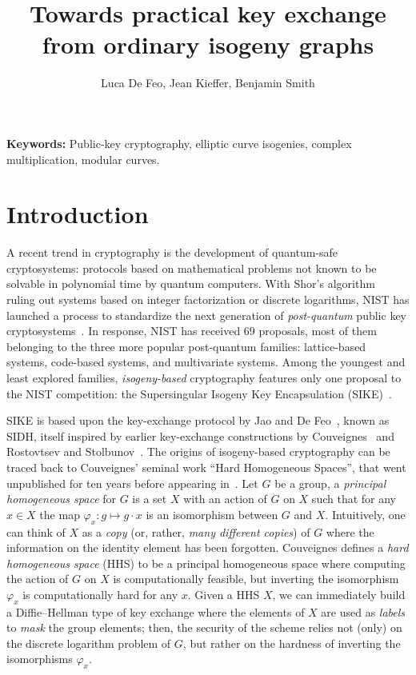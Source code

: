 \documentclass{article}
\title{Towards practical key exchange from ordinary isogeny graphs}
\author{Luca De Feo, Jean Kieffer, Benjamin Smith}
\theoremstyle{definition}
\begin{document}
\maketitle

\begin{abstract}
\end{abstract}

\textbf{Keywords:} Public-key cryptography, elliptic curve isogenies,
complex multiplication, modular curves.

\section{Introduction}
\label{sec:introduction}

A recent trend in cryptography is the development of quantum-safe
cryptosystems: protocols based on mathematical problems not known to
be solvable in polynomial time by quantum computers. With Shor's
algorithm~\cite{shor1994algorithms} ruling out systems based on
integer factorization or discrete logarithms, NIST has launched a
process to standardize the next generation of \emph{post-quantum}
public key cryptosystems~\cite{NIST2016}. In response, NIST has
received 69 proposals, most of them belonging to the three more
popular post-quantum families: lattice-based systems, code-based
systems, and multivariate systems. Among the youngest and least
explored families, \emph{isogeny-based} cryptography features only one
proposal to the NIST competition: the Supersingular Isogeny Key
Encapsulation (SIKE)~\cite{SIKE}.

SIKE is based upon the key-exchange protocol by Jao and De
Feo~\cite{jao+defeo2011}, known as SIDH, itself inspired by earlier
key-exchange constructions by Couveignes~\cite{cryptoeprint:2006:291}
and Rostovtsev and
Stolbunov~\cite{rostovtsev+stolbunov06,stolbunov-red,Stol}. The
origins of isogeny-based cryptography can be traced back to
Couveignes' seminal work ``Hard Homogeneous Spaces'', that went
unpublished for ten years before appearing
in~\cite{cryptoeprint:2006:291}. Let $G$ be a group, a \emph{principal
  homogeneous space} for $G$ is a set $X$ with an
action of $G$ on $X$ such that for any $x∈X$ the map $φ_x:g↦g·x$ is an
isomorphism between $G$ and $X$. Intuitively, one can think of $X$ as
a \emph{copy} (or, rather, \emph{many different copies}) of $G$ where
the information on the identity element has been forgotten. Couveignes
defines a \emph{hard homogeneous space} (HHS) to be a principal
homogeneous space where computing
the action of $G$ on $X$ is computationally feasible, but inverting
the isomorphism $φ_x$ is computationally hard for any $x$. 
Given a HHS $X$, we can immediately build a Diffie--Hellman type of key exchange
where the elements of $X$ are used as \emph{labels} to \emph{mask} the
group elements; then, the security of the scheme relies not (only) on
the discrete logarithm problem of $G$, but rather on the hardness of
inverting the isomorphisms $φ_x$.
\end{document}
